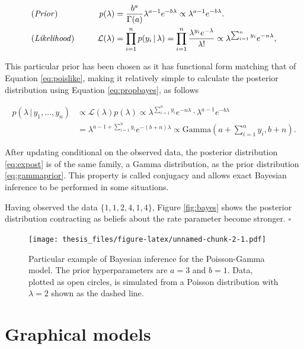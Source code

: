\documentclass[11pt,]{book}
\begin{document}
\begin{alignat}{2}
&\text{(\textit{Prior})}      & \qquad            p(\lambda) &= \frac{b^a}{\Gamma(a)} \lambda^{a-1} e^{-b\lambda} \propto \lambda^{a-1} e^{-b\lambda}. \label{eq:gammaprior} \\
&\text{(\textit{Likelihood})} &         \mathcal{L}(\lambda) &= \prod_{i = 1}^n p(y_i \, | \, \lambda) = \prod_{i = 1}^n \frac{\lambda^{y_i} e^{-\lambda}}{\lambda!} \propto \lambda^{\sum_{i = 1}^n y_i} e^{-n\lambda}, \label{eq:poislike}
\end{alignat}

This particular prior has been chosen as it has functional form matching
that of Equation \eqref{eq:poislike}, making it relatively simple to
calculate the posterior distribution using Equation
\eqref{eq:propbayes}, as follows

\begin{align}
p(\lambda \, | \, y_1, \ldots, y_n) &\propto \mathcal{L}(\lambda)p(\lambda) \nonumber \propto \lambda^{\sum_{i = 1}^n y_i} e^{-n\lambda} \cdot \lambda^{a-1} e^{-b\lambda} \nonumber \\
&= \lambda^{a - 1 + \sum_{i = 1}^n y_i} e^{-(b + n)\lambda} \propto \text{Gamma}(a + \sum_{i = 1}^n y_i, b + n). \label{eq:expost}
\end{align}

After updating conditional on the observed data, the posterior
distribution \eqref{eq:expost} is of the same family, a Gamma
distribution, as the prior distribution \eqref{eq:gammaprior}. This
property is called conjugacy and allows exact Bayesian inference to be
performed in some situations.

Having observed the data \(\{1, 1, 2, 4, 1, 4\}\), Figure
\eqref{fig:bayes} shows the posterior distribution contracting as
beliefs about the rate parameter become stronger. \hfill \(\square\)

\begin{figure}
\centering
\texttt{[image: thesis\_files/figure-latex/unnamed-chunk-2-1.pdf]}
\caption{\label{fig:unnamed-chunk-2}Particular example of Bayesian inference
for the Poisson-Gamma model. The prior hyperparameters are \(a = 3\) and
\(b = 1\). Data, plotted as open circles, is simulated from a Poisson
distribution with \(\lambda = 2\) shown as the dashed line.
\label{fig:bayes}}
\end{figure}

\section{\texorpdfstring{Graphical models
\label{sec:graph}}{Graphical models }}\label{graphical-models}
\end{document}
